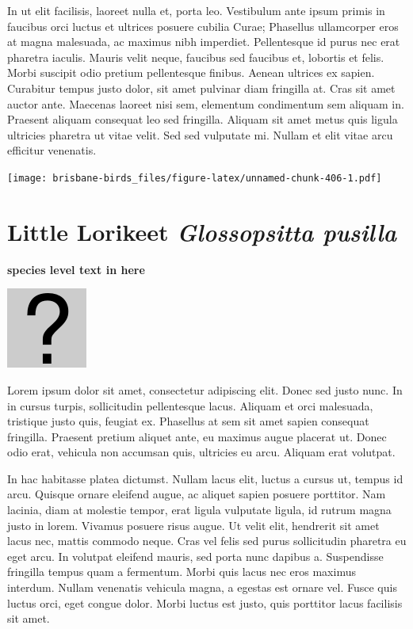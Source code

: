 \documentclass[]{book}
\let\origfigure\figure
\let\endorigfigure\endfigure
\renewenvironment{figure}[1][2] {
  \expandafter\origfigure\expandafter[H]
} {
  \endorigfigure
}
\begin{document}
In ut elit facilisis, laoreet nulla et, porta leo. Vestibulum ante ipsum
primis in faucibus orci luctus et ultrices posuere cubilia Curae;
Phasellus ullamcorper eros at magna malesuada, ac maximus nibh
imperdiet. Pellentesque id purus nec erat pharetra iaculis. Mauris velit
neque, faucibus sed faucibus et, lobortis et felis. Morbi suscipit odio
pretium pellentesque finibus. Aenean ultrices ex sapien. Curabitur
tempus justo dolor, sit amet pulvinar diam fringilla at. Cras sit amet
auctor ante. Maecenas laoreet nisi sem, elementum condimentum sem
aliquam in. Praesent aliquam consequat leo sed fringilla. Aliquam sit
amet metus quis ligula ultricies pharetra ut vitae velit. Sed sed
vulputate mi. Nullam et elit vitae arcu efficitur venenatis.

\begin{figure}
\centering
\texttt{[image: brisbane-birds\_files/figure-latex/unnamed-chunk-406-1.pdf]}
\caption{\label{fig:unnamed-chunk-406}insert figure caption}
\end{figure}

\section{\texorpdfstring{Little Lorikeet \emph{Glossopsitta
pusilla}}{Little Lorikeet Glossopsitta pusilla}}\label{little-lorikeet-glossopsitta-pusilla}

\textbf{species level text in here}

\begin{figure}
\centering
\includegraphics{assets/missing.png}
\caption{No image for species}
\end{figure}

Lorem ipsum dolor sit amet, consectetur adipiscing elit. Donec sed justo
nunc. In in cursus turpis, sollicitudin pellentesque lacus. Aliquam et
orci malesuada, tristique justo quis, feugiat ex. Phasellus at sem sit
amet sapien consequat fringilla. Praesent pretium aliquet ante, eu
maximus augue placerat ut. Donec odio erat, vehicula non accumsan quis,
ultricies eu arcu. Aliquam erat volutpat.

In hac habitasse platea dictumst. Nullam lacus elit, luctus a cursus ut,
tempus id arcu. Quisque ornare eleifend augue, ac aliquet sapien posuere
porttitor. Nam lacinia, diam at molestie tempor, erat ligula vulputate
ligula, id rutrum magna justo in lorem. Vivamus posuere risus augue. Ut
velit elit, hendrerit sit amet lacus nec, mattis commodo neque. Cras vel
felis sed purus sollicitudin pharetra eu eget arcu. In volutpat eleifend
mauris, sed porta nunc dapibus a. Suspendisse fringilla tempus quam a
fermentum. Morbi quis lacus nec eros maximus interdum. Nullam venenatis
vehicula magna, a egestas est ornare vel. Fusce quis luctus orci, eget
congue dolor. Morbi luctus est justo, quis porttitor lacus facilisis sit
amet.
\end{document}
